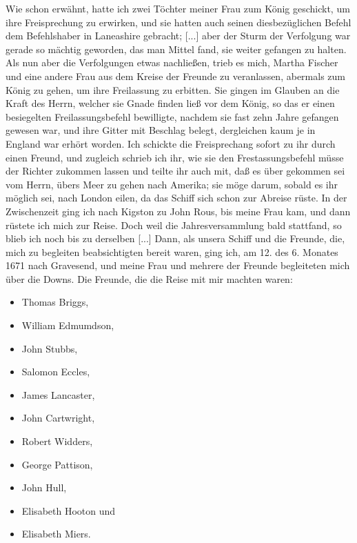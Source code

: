 Wie schon erwähnt, hatte ich zwei Töchter meiner Frau
zum König geschickt, um ihre Freisprechung zu erwirken, und sie
hatten auch seinen diesbezüglichen Befehl dem Befehlshaber in
Laneashire gebracht; [...] aber der Sturm der Verfolgung war
gerade so mächtig geworden, das man Mittel fand, sie weiter
gefangen zu halten. Als nun aber die Verfolgungen etwas
nachließen, trieb es mich, Martha 
Fischer und eine andere Frau
aus dem Kreise der Freunde zu veranlassen, abermals zum König
zu gehen, um ihre Freilassung zu erbitten. Sie gingen im Glauben
an die Kraft des Herrn, welcher sie Gnade finden ließ vor dem
König, so das er einen besiegelten Freilassungsbefehl bewilligte,
nachdem sie fast zehn Jahre gefangen gewesen war, und ihre Gitter
mit Beschlag belegt, dergleichen kaum je in England war erhört
worden. Ich schickte die Freisprechang sofort zu ihr durch einen
Freund, und zugleich schrieb ich ihr, wie sie den Frestassungsbefehl
müsse der Richter zukommen lassen und teilte ihr auch
mit, daß es über gekommen sei vom Herrn, übers Meer zu
gehen nach Amerika; sie möge darum, sobald es ihr möglich sei,
nach London eilen, da das Schiff sich schon zur Abreise rüste.
In der Zwischenzeit ging ich nach Kigston zu John Rous, bis
meine Frau kam, und dann rüstete ich mich zur Reise. Doch
weil die Jahresversammlung bald stattfand, so blieb ich noch bis
zu derselben [...] Dann, als unsera Schiff und die Freunde, die,
mich zu begleiten beabsichtigten bereit waren, ging ich, am 12. des
6. Monates 1671 nach Gravesend, und meine Frau und mehrere der
Freunde begleiteten mich über die Downs. Die Freunde,
die die Reise mit mir machten waren: 
\begin{itemize}
 \item Thomas Briggs,
 \item William Edmumdson, 
 \item John Stubbs, 
 \item Salomon Eccles, 
 \item James Lancaster, 
 \item John Cartwright, 
 \item Robert Widders, 
 \item George Pattison,
 \item John Hull, 
 \item Elisabeth Hooton und 
 \item Elisabeth Miers.
\end{itemize}

